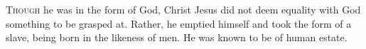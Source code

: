 \lettrine[lines=3,loversize=0.15]{T}{hough} he was in the form of God, Christ Jesus did not deem equality with God something to be grasped at. Rather, he emptied himself and took the form of a slave, being born in the likeness of men. He was known to be of human estate.
